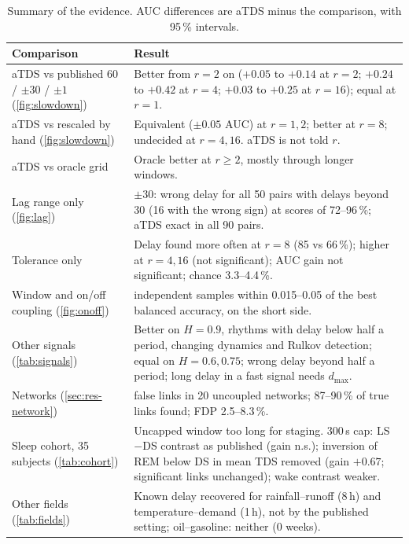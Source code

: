 \documentclass[11pt,a4paper]{article}
\begin{document}
\begin{table}[t]
\centering
\caption{Summary of the evidence. AUC differences are aTDS minus the comparison, with 95\,\% intervals.}
\label{tab:summary}
\footnotesize
\begin{tabularx}{\textwidth}{>{\raggedright\arraybackslash}p{4.2cm}>{\raggedright\arraybackslash}X}
\toprule
Comparison & Result \\
\midrule
aTDS vs published 60 / $\pm30$ / $\pm1$ (\cref{fig:slowdown}) & Better from $r = 2$ on ($+0.05$ to $+0.14$ at $r = 2$; $+0.24$ to $+0.42$ at $r = 4$; $+0.03$ to $+0.25$ at $r = 16$); equal at $r = 1$. \\
aTDS vs rescaled by hand (\cref{fig:slowdown}) & Equivalent ($\pm0.05$ AUC) at $r = 1, 2$; better at $r = 8$; undecided at $r = 4, 16$. aTDS is not told $r$. \\
aTDS vs oracle grid & Oracle better at $r \ge 2$, mostly through longer windows. \\
Lag range only (\cref{fig:lag}) & $\pm30$: wrong delay for all 50 pairs with delays beyond 30 (16 with the wrong sign) at scores of 72--96\,\%; aTDS exact in all 90 pairs. \\
Tolerance only & Delay found more often at $r = 8$ (85 vs 66\,\%); higher at $r = 4, 16$ (not significant); AUC gain not significant; chance 3.3--4.4\,\%. \\
Window and on/off coupling (\cref{fig:onoff}) & 30 independent samples within 0.015--0.05 of the best balanced accuracy, on the short side. \\
Other signals (\cref{tab:signals}) & Better on $H = 0.9$, rhythms with delay below half a period, changing dynamics and Rulkov detection; equal on $H = 0.6, 0.75$; wrong delay beyond half a period; long delay in a fast signal needs $d_{\max}$. \\
Networks (\cref{sec:res-network}) & 0 false links in 20 uncoupled networks; 87--90\,\% of true links found; FDP 2.5--8.3\,\%. \\
Sleep cohort, 35 subjects (\cref{tab:cohort}) & Uncapped window too long for staging. 300\,s cap: LS$-$DS contrast as published (gain n.s.); inversion of REM below DS in mean TDS removed (gain $+0.67$; significant links unchanged); wake contrast weaker. \\
Other fields (\cref{tab:fields}) & Known delay recovered for rainfall--runoff (8\,h) and temperature--demand (1\,h), not by the published setting; oil--gasoline: neither (0 weeks). \\
\bottomrule
\end{tabularx}
\end{table}
\end{document}
